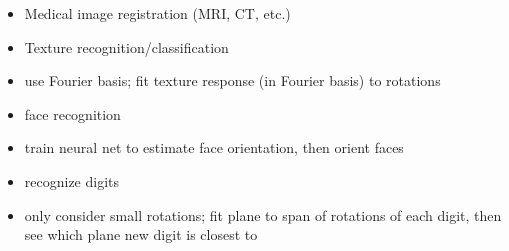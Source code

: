 \documentclass[12pt]{article}
\begin{document}
\begin{itemize}
	\item Medical image registration (MRI, CT, etc.)
\end{itemize}
%
\begin{itemize}
\item Texture recognition/classification
\item use Fourier basis; fit texture response (in Fourier basis) to rotations 
\end{itemize}
%
\begin{itemize}
	\item face recognition
	\item train neural net to estimate face orientation, then orient faces
\end{itemize}
%
\begin{itemize}
	\item recognize digits
	\item only consider small rotations; fit plane to span of rotations of each digit, then see which plane new digit is closest to
\end{itemize}
\end{document}
